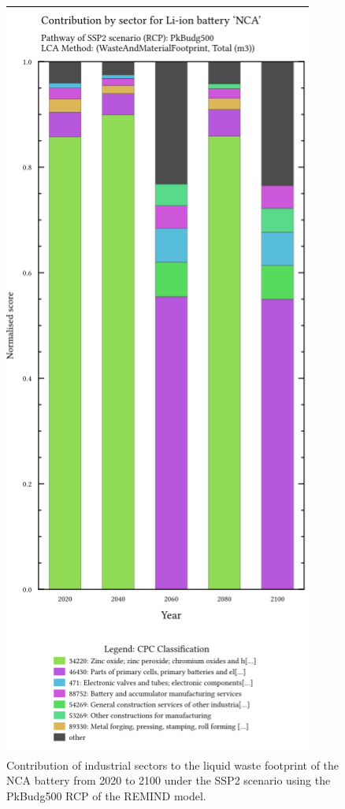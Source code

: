\begin{figure}
    \centering
    \includegraphics[width=0.8\linewidth]{figures/cpc_contribution.png
    }
    \caption{Contribution of industrial sectors to the liquid waste footprint of the NCA battery from 2020 to 2100 under the SSP2 scenario using the PkBudg500 RCP of the REMIND model.}\label{fig:cpc_contribution}
\end{figure}